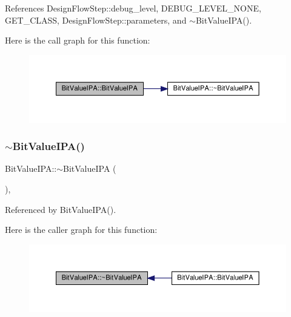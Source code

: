 References Design\+Flow\+Step\+::debug\+\_\+level, D\+E\+B\+U\+G\+\_\+\+L\+E\+V\+E\+L\+\_\+\+N\+O\+NE, G\+E\+T\+\_\+\+C\+L\+A\+SS, Design\+Flow\+Step\+::parameters, and $\sim$\+Bit\+Value\+I\+P\+A().

Here is the call graph for this function\+:
\nopagebreak
\begin{figure}[H]
\begin{center}
\leavevmode
\includegraphics[width=350pt]{da/d6c/classBitValueIPA_aa139744d704f77b52956f5ee3a9fd80c_cgraph}
\end{center}
\end{figure}
\mbox{\label{classBitValueIPA_a58528bc1a3e758b534fc3180dfcc2cf3}} 
\subsubsection{\texorpdfstring{$\sim$\+Bit\+Value\+I\+P\+A()}{~BitValueIPA()}}
{\footnotesize\ttfamily Bit\+Value\+I\+P\+A\+::$\sim$\+Bit\+Value\+I\+PA (\begin{DoxyParamCaption}{ }\end{DoxyParamCaption})\hspace{0.3cm}{\ttfamily [override]}, {\ttfamily [default]}}



Referenced by Bit\+Value\+I\+P\+A().

Here is the caller graph for this function\+:
\nopagebreak
\begin{figure}[H]
\begin{center}
\leavevmode
\includegraphics[width=350pt]{da/d6c/classBitValueIPA_a58528bc1a3e758b534fc3180dfcc2cf3_icgraph}
\end{center}
\end{figure}


